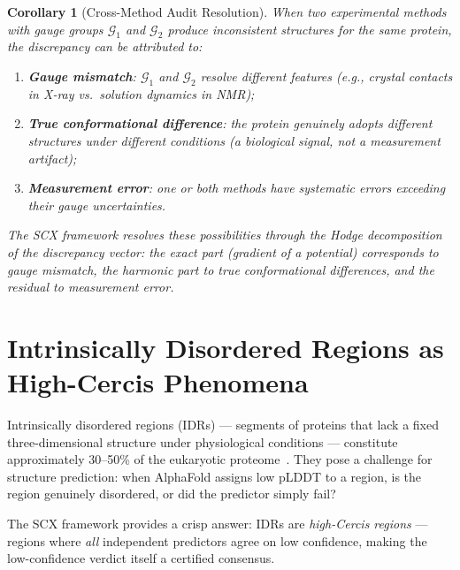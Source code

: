 \documentclass[12pt,a4paper]{article}
\newtheorem{corollary}[theorem]{Corollary}
\theoremstyle{remark}
\newcommand{\G}{\mathcal{G}}
\begin{document}
\begin{corollary}[Cross-Method Audit Resolution]
\label{cor:cross-method}
When two experimental methods with gauge groups $\G_1$ and $\G_2$ produce inconsistent structures for the same protein, the discrepancy can be attributed to:
\begin{enumerate}[leftmargin=*,label=(\alph*)]
    \item \textbf{Gauge mismatch}: $\G_1$ and $\G_2$ resolve different features (e.g., crystal contacts in X-ray vs.\ solution dynamics in NMR);
    \item \textbf{True conformational difference}: the protein genuinely adopts different structures under different conditions (a biological signal, not a measurement artifact);
    \item \textbf{Measurement error}: one or both methods have systematic errors exceeding their gauge uncertainties.
\end{enumerate}
The SCX framework resolves these possibilities through the Hodge decomposition of the discrepancy vector: the exact part (gradient of a potential) corresponds to gauge mismatch, the harmonic part to true conformational differences, and the residual to measurement error.
\end{corollary}

\section{Intrinsically Disordered Regions as High-Cercis Phenomena}
\label{sec:idr}

Intrinsically disordered regions (IDRs) — segments of proteins that lack a fixed three-dimensional structure under physiological conditions — constitute approximately 30--50\% of the eukaryotic proteome~\cite{van2014classification, wright2015intrinsically}.
They pose a challenge for structure prediction: when AlphaFold assigns low pLDDT to a region, is the region genuinely disordered, or did the predictor simply fail?

The SCX framework provides a crisp answer: IDRs are \emph{high-Cercis regions} — regions where \emph{all} independent predictors agree on low confidence, making the low-confidence verdict itself a certified consensus.
\end{document}
